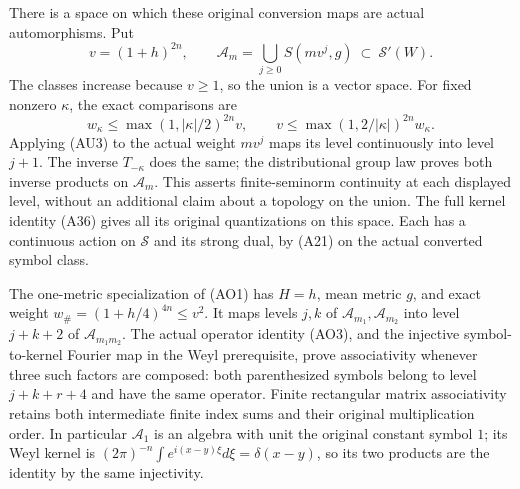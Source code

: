 \documentclass[
  11pt,
]{article}
\begin{document}
There is a space on which these original conversion maps are actual
automorphisms. Put \[
v=(1+h)^{2n},\qquad
\mathcal A_m=\bigcup_{j\ge0}S(mv^j,g)\ \subset\ \mathcal S'(W).
\tag{AU4}
\] The classes increase because \(v\ge1\), so the union is a vector
space. For fixed nonzero \(\kappa\), the exact comparisons are \[
w_\kappa\le\max(1,|\kappa|/2)^{2n}v,\qquad
v\le\max(1,2/|\kappa|)^{2n}w_\kappa.
\tag{AU5}
\] Applying (AU3) to the actual weight \(mv^j\) maps its level
continuously into level \(j+1\). The inverse \(T_{-\kappa}\) does the
same; the distributional group law proves both inverse products on
\(\mathcal A_m\). This asserts finite-seminorm continuity at each
displayed level, without an additional claim about a topology on the
union. The full kernel identity (A36) gives all its original
quantizations on this space. Each has a continuous action on
\(\mathcal S\) and its strong dual, by (A21) on the actual converted
symbol class.

The one-metric specialization of (AO1) has \(H=h\), mean metric \(g\),
and exact weight \(w_\#=(1+h/4)^{4n}\le v^2\). It maps levels \(j,k\) of
\(\mathcal A_{m_1},\mathcal A_{m_2}\) into level \(j+k+2\) of
\(\mathcal A_{m_1m_2}\). The actual operator identity (AO3), and the
injective symbol-to-kernel Fourier map in the Weyl prerequisite, prove
associativity whenever three such factors are composed: both
parenthesized symbols belong to level \(j+k+r+4\) and have the same
operator. Finite rectangular matrix associativity retains both
intermediate finite index sums and their original multiplication order.
In particular \(\mathcal A_1\) is an algebra with unit the original
constant symbol \(1\); its Weyl kernel is
\((2\pi)^{-n}\int e^{i(x-y)\xi}d\xi=\delta(x-y)\), so its two products
are the identity by the same injectivity.
\end{document}
